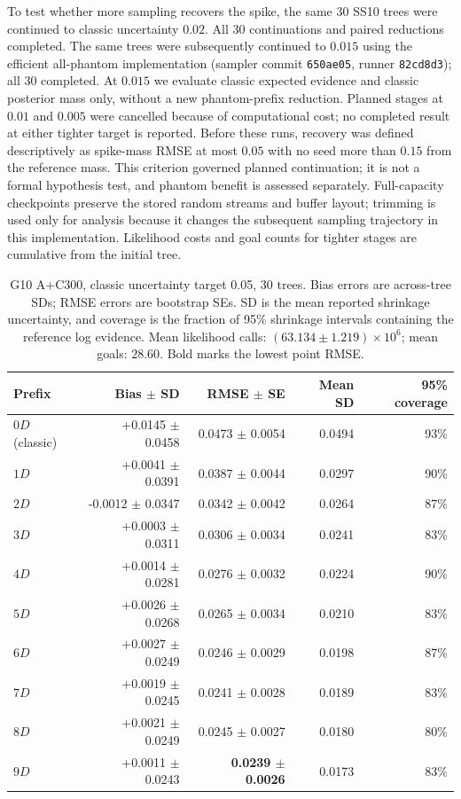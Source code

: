 \documentclass[pdflatex,sn-basic,icol]{sn-jnl}
\theoremstyle{plain}
\theoremstyle{definition}
\begin{document}
To test whether more sampling recovers the spike, the same $30$ SS10 trees were continued to classic uncertainty $0.02$.
All $30$ continuations and paired reductions completed. The same trees were subsequently continued to $0.015$ using the efficient all-phantom implementation (sampler commit \texttt{650ae05}, runner \texttt{82cd8d3}); all $30$ completed. At $0.015$ we evaluate classic expected evidence and classic posterior mass only, without a new phantom-prefix reduction. Planned stages at $0.01$ and $0.005$ were cancelled because of computational cost; no completed result at either tighter target is reported.
Before these runs, recovery was defined descriptively as spike-mass RMSE at most $0.05$ with no seed more than $0.15$ from the reference mass.
This criterion governed planned continuation; it is not a formal hypothesis test, and phantom benefit is assessed separately.
Full-capacity checkpoints preserve the stored random streams and buffer layout; trimming is used only for analysis because it changes the subsequent sampling trajectory in this implementation.
Likelihood costs and goal counts for tighter stages are cumulative from the initial tree.
\begin{table}[t]
\centering
\scriptsize
\caption{G10 A+C300, classic uncertainty target 0.05, 30 trees. Bias errors are across-tree SDs; RMSE errors are bootstrap SEs. SD is the mean reported shrinkage uncertainty, and coverage is the fraction of 95\% shrinkage intervals containing the reference log evidence. Mean likelihood calls: $(63.134\pm1.219)\times10^6$; mean goals: $28.60$. Bold marks the lowest point RMSE.}
\label{tab:phantom_evidence_g10_0p05}
\begin{tabular}{lrrrr}
\toprule
Prefix & Bias $\pm$ SD & RMSE $\pm$ SE & Mean SD & 95\% coverage \\
\midrule
$0D$ (classic) & +0.0145 $\pm$ 0.0458 & 0.0473 $\pm$ 0.0054 & 0.0494 & 93\% \\
$1D$ & +0.0041 $\pm$ 0.0391 & 0.0387 $\pm$ 0.0044 & 0.0297 & 90\% \\
$2D$ & -0.0012 $\pm$ 0.0347 & 0.0342 $\pm$ 0.0042 & 0.0264 & 87\% \\
$3D$ & +0.0003 $\pm$ 0.0311 & 0.0306 $\pm$ 0.0034 & 0.0241 & 83\% \\
$4D$ & +0.0014 $\pm$ 0.0281 & 0.0276 $\pm$ 0.0032 & 0.0224 & 90\% \\
$5D$ & +0.0026 $\pm$ 0.0268 & 0.0265 $\pm$ 0.0034 & 0.0210 & 83\% \\
$6D$ & +0.0027 $\pm$ 0.0249 & 0.0246 $\pm$ 0.0029 & 0.0198 & 87\% \\
$7D$ & +0.0019 $\pm$ 0.0245 & 0.0241 $\pm$ 0.0028 & 0.0189 & 83\% \\
$8D$ & +0.0021 $\pm$ 0.0249 & 0.0245 $\pm$ 0.0027 & 0.0180 & 80\% \\
$9D$ & +0.0011 $\pm$ 0.0243 & \textbf{0.0239 $\pm$ 0.0026} & 0.0173 & 83\% \\
\bottomrule
\end{tabular}
\end{table}
\end{document}
